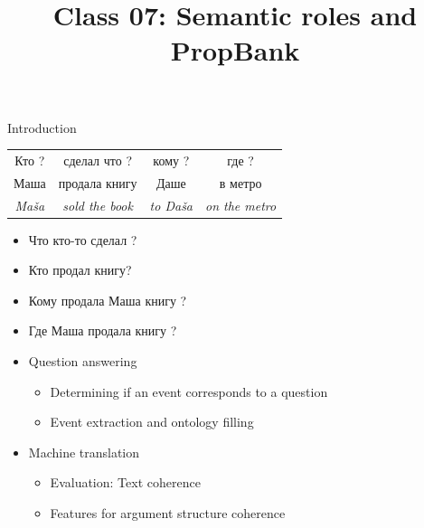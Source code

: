 \documentclass[10pt, compress]{beamer}
\title{Class 07: Semantic roles and PropBank}
\date{}
\begin{document}
\maketitle

\begin{frame}{Introduction}


\begin{center}
\begin{tabular}{cccc}
  Кто ?      &   сделал что ? & кому ? & где ? \\
{\Large Маша} & {\Large продала книгу} & {\Large Даше} & {\Large в метро} \\
 \emph{Maša} & \emph{sold the book} & \emph{to Daša} & \emph{on the metro} \\
\end{tabular}
\end{center}

\begin{itemize}
  \item Что кто-то сделал ?
  \item Кто продал книгу? 
  \item Кому продала Маша книгу ?
  \item Где Маша продала книгу ?
\end{itemize}

\end{frame}

\begin{frame}

\begin{itemize}
  \item Question answering 
  \begin{itemize}
    \item Determining if an event corresponds to a question
    \item Event extraction and ontology filling
  \end{itemize}
  \item Machine translation
  \begin{itemize}
     \item Evaluation: Text coherence
     \item Features for argument structure coherence
  \end{itemize}
\end{itemize} 

\end{frame}
\end{document}
